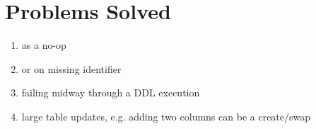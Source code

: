 \documentclass[12pt]{article}
\begin{document}
\newpage

\section{Problems Solved}

\begin{enumerate}
  \item {} as a no-op
  \item {} or  on missing identifier
  \item failing midway through a DDL execution
  \item large table updates, e.g. adding two columns can be a create/swap
\end{enumerate}

\newpage



\end{document}

